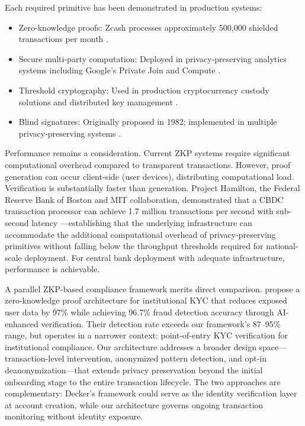 \documentclass[11pt]{article}
\begin{document}
Each required primitive has been demonstrated in production systems:

\begin{itemize}
    \item Zero-knowledge proofs: Zcash processes approximately 500,000 shielded transactions per month \citep{ElectricCoin2023}.
    \item Secure multi-party computation: Deployed in privacy-preserving analytics systems including Google's Private Join and Compute \citep{Google2019}.
    \item Threshold cryptography: Used in production cryptocurrency custody solutions and distributed key management \citep{Gennaro2016}.
    \item Blind signatures: Originally proposed in 1982; implemented in multiple privacy-preserving systems \citep{Chaum1982}.
\end{itemize}

Performance remains a consideration. Current ZKP systems require significant computational overhead compared to transparent transactions. However, proof generation can occur client-side (user devices), distributing computational load. Verification is substantially faster than generation. Project Hamilton, the Federal Reserve Bank of Boston and MIT collaboration, demonstrated that a CBDC transaction processor can achieve 1.7 million transactions per second with sub-second latency \citep{Lovejoy2023Hamilton}---establishing that the underlying infrastructure can accommodate the additional computational overhead of privacy-preserving primitives without falling below the throughput thresholds required for national-scale deployment. For central bank deployment with adequate infrastructure, performance is achievable.

A parallel ZKP-based compliance framework merits direct comparison. \citet{decker2025zkp} propose a zero-knowledge proof architecture for institutional KYC that reduces exposed user data by 97\% while achieving 96.7\% fraud detection accuracy through AI-enhanced verification. Their detection rate exceeds our framework's 87--95\% range, but operates in a narrower context: point-of-entry KYC verification for institutional compliance. Our architecture addresses a broader design space---transaction-level intervention, anonymized pattern detection, and opt-in deanonymization---that extends privacy preservation beyond the initial onboarding stage to the entire transaction lifecycle. The two approaches are complementary: Decker's framework could serve as the identity verification layer at account creation, while our architecture governs ongoing transaction monitoring without identity exposure.
\end{document}
